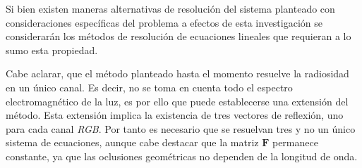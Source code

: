 Si bien existen maneras alternativas de resolución del sistema planteado con consideraciones específicas del problema a efectos de esta investigación se considerarán los métodos de resolución de ecuaciones lineales que requieran a lo sumo esta propiedad.

Cabe aclarar, que el método planteado hasta el momento resuelve la radiosidad en un único canal. Es decir, no se toma en cuenta todo el espectro electromagnético de la luz, es por ello que puede establecerse una extensión del método. Esta extensión implica la existencia de tres vectores de reflexión, uno para cada canal \textit{RGB}. Por tanto es necesario que se resuelvan tres y no un único sistema de ecuaciones, aunque cabe destacar que la matriz $\mathbf{F}$ permanece constante, ya que las oclusiones geométricas no dependen de la longitud de onda.